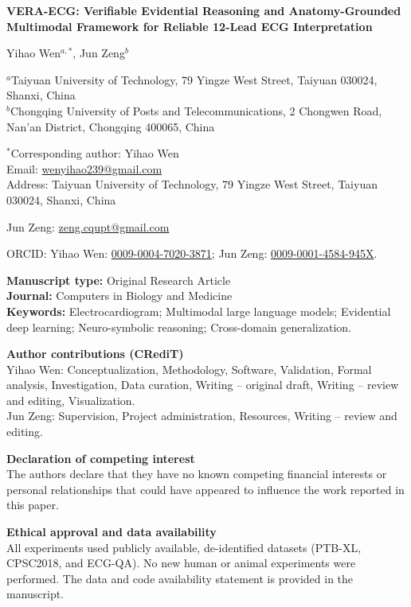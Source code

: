 ﻿\documentclass[12pt]{article}
\begin{document}
\begin{center}
{\Large\bfseries VERA-ECG: Verifiable Evidential Reasoning and Anatomy-Grounded Multimodal Framework for Reliable 12-Lead ECG Interpretation}

\vspace{1.5em}
{\large Yihao Wen$^{a,*}$, Jun Zeng$^{b}$}
\end{center}

\vspace{1em}
\noindent $^{a}$Taiyuan University of Technology, 79 Yingze West Street, Taiyuan 030024, Shanxi, China\\
$^{b}$Chongqing University of Posts and Telecommunications, 2 Chongwen Road, Nan'an District, Chongqing 400065, China

\vspace{1em}
\noindent $^{*}$Corresponding author: Yihao Wen\\
Email: \href{mailto:wenyihao239@gmail.com}{wenyihao239@gmail.com}\\
Address: Taiyuan University of Technology, 79 Yingze West Street, Taiyuan 030024, Shanxi, China

\vspace{1em}
\noindent Jun Zeng: \href{mailto:zeng.cqupt@gmail.com}{zeng.cqupt@gmail.com}

\vspace{1em}
\noindent ORCID: Yihao Wen: \href{https://orcid.org/0009-0004-7020-3871}{0009-0004-7020-3871}; Jun Zeng: \href{https://orcid.org/0009-0001-4584-945X}{0009-0001-4584-945X}.

\vspace{2em}
\noindent\textbf{Manuscript type:} Original Research Article\\
\textbf{Journal:} Computers in Biology and Medicine\\
\textbf{Keywords:} Electrocardiogram; Multimodal large language models; Evidential deep learning; Neuro-symbolic reasoning; Cross-domain generalization.

\vspace{2em}
\noindent\textbf{Author contributions (CRediT)}\\
Yihao Wen: Conceptualization, Methodology, Software, Validation, Formal analysis, Investigation, Data curation, Writing -- original draft, Writing -- review and editing, Visualization.\\
Jun Zeng: Supervision, Project administration, Resources, Writing -- review and editing.

\vspace{2em}
\noindent\textbf{Declaration of competing interest}\\
The authors declare that they have no known competing financial interests or personal relationships that could have appeared to influence the work reported in this paper.

\vspace{2em}
\noindent\textbf{Ethical approval and data availability}\\
All experiments used publicly available, de-identified datasets (PTB-XL, CPSC2018, and ECG-QA). No new human or animal experiments were performed. The data and code availability statement is provided in the manuscript.
\end{document}
